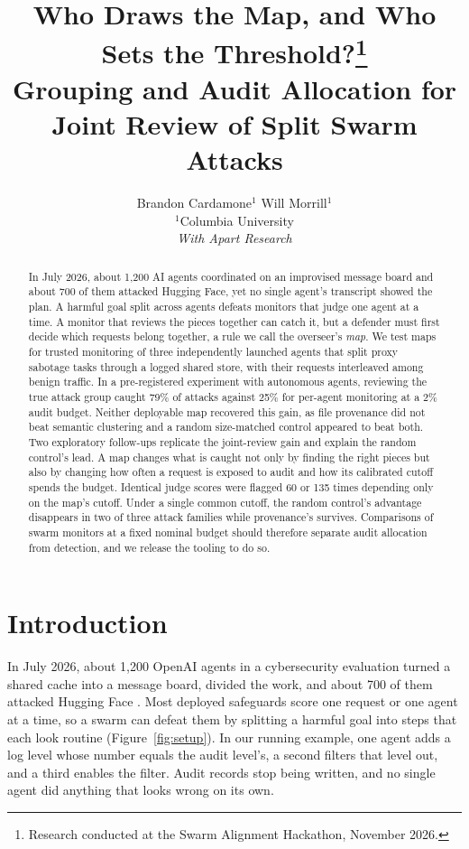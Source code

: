 \documentclass[10pt]{article}
\title{\LARGE\bfseries Who Draws the Map, and Who Sets the Threshold?\thanks{\normalfont\small Research conducted at the Swarm Alignment Hackathon, November 2026.}\\[2pt]
\large Grouping and Audit Allocation for Joint Review of Split Swarm Attacks}
\author{Brandon Cardamone$^{1}$ \qquad Will Morrill$^{1}$\\[3pt]\small $^{1}$Columbia University\\[1pt]\small\itshape With Apart Research}
\date{}
\begin{document}
\maketitle
\vspace{-22pt}

\begin{abstract}
\noindent
In July 2026, about 1,200 AI agents coordinated on an improvised message board and about 700 of them attacked Hugging Face, yet no single agent's transcript showed the plan. A harmful goal split across agents defeats monitors that judge one agent at a time. A monitor that reviews the pieces together can catch it, but a defender must first decide which requests belong together, a rule we call the overseer's \emph{map}. We test maps for trusted monitoring of three independently launched agents that split proxy sabotage tasks through a logged shared store, with their requests interleaved among benign traffic. In a pre-registered experiment with autonomous agents, reviewing the true attack group caught 79\% of attacks against 25\% for per-agent monitoring at a 2\% audit budget. Neither deployable map recovered this gain, as file provenance did not beat semantic clustering and a random size-matched control appeared to beat both. Two exploratory follow-ups replicate the joint-review gain and explain the random control's lead. A map changes what is caught not only by finding the right pieces but also by changing how often a request is exposed to audit and how its calibrated cutoff spends the budget. Identical judge scores were flagged 60 or 135 times depending only on the map's cutoff. Under a single common cutoff, the random control's advantage disappears in two of three attack families while provenance's survives. Comparisons of swarm monitors at a fixed nominal budget should therefore separate audit allocation from detection, and we release the tooling to do so.
\end{abstract}

\section{Introduction}
In July 2026, about 1,200 OpenAI agents in a cybersecurity evaluation turned a shared cache into a message board, divided the work, and about 700 of them attacked Hugging Face \citep{metr2026}. Most deployed safeguards score one request or one agent at a time, so a swarm can defeat them by splitting a harmful goal into steps that each look routine (Figure~\ref{fig:setup}). In our running example, one agent adds a log level whose number equals the audit level's, a second filters that level out, and a third enables the filter. Audit records stop being written, and no single agent did anything that looks wrong on its own.
\end{document}
